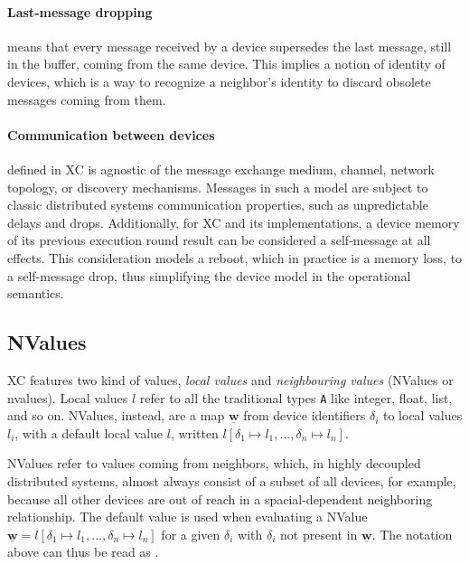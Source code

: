 \paragraph{Last-message dropping} means that every message received by a device supersedes the last message, still in the buffer, coming from the same device.\cite{xc}
%
This implies a notion of identity of devices, which is a way to recognize a neighbor's identity to discard obsolete messages coming from them.

\paragraph{Communication between devices} defined in \ac{XC} is agnostic of the message exchange medium, channel, network topology, or discovery mechanisms.
%
Messages in such a model are subject to classic distributed systems communication properties, such as unpredictable delays and drops\cite{xc}.
%
Additionally, for \ac{XC} and its implementations, a device memory of its previous execution round result can be considered a self-message at all effects.
%
This consideration models a reboot, which in practice is a memory loss, to a self-message drop, thus simplifying the device model in the operational semantics.

\subsection{NValues}

\ac{XC} features two kind of values, \textit{local values} and \textit{neighbouring values} (NValues or nvalues).
%
Local values $l$ refer to all the traditional types \texttt{A} like integer, float, list, and so on.
%
NValues, instead, are a map $\underline{\mathbf{w}}$ from device identifiers $\delta_i$ to local values $l_i$, with a default local value $l$, written $l[\delta_1 \mapsto l_1, ..., \delta_n \mapsto l_n]$\cite{xc}.

NValues refer to values coming from neighbors, which, in highly decoupled distributed systems, almost always consist of a subset of all devices, for example, because all other devices are out of reach in a spacial-dependent neighboring relationship.
%
The default value is used when evaluating a NValue $\underline{\mathbf{w}} = l[\delta_1 \mapsto l_1, ..., \delta_n \mapsto l_n]$ for a given $\delta_i$ with $\delta_i$ not present in $\underline{\mathbf{w}}$.
%
The notation above can thus be read as \cite{xc}.

